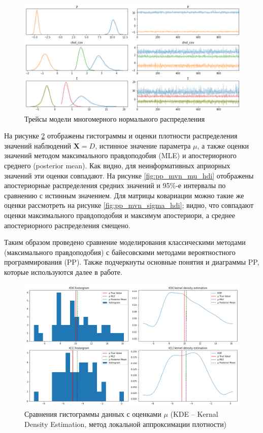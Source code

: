 \documentclass[a4paper,14pt]{extreport}
\begin{document}
\begin{figure}[H]
	\includegraphics[width=\linewidth]{img/gen/pp_mvn_trace.png}
	\caption{Трейсы модели многомерного нормального распределения}
	\label{fig:pp_mvn_trace}
\end{figure}

На рисунке \ref{fig:pp_mvn_mu_comparison} отображены гистограммы и оценки плотности распределения значений наблюдений $\mathbf{X} = D$, истинное значение параметра $\mu$, а также оценки значений методом максимального правдоподобия (MLE) и апостериорного среднего (posterior mean). Как видно, для неинформативных априорных значений эти оценки совпадают. На рисунке \ref{fig:pp_mvn_mu_hdi} отображены апостериорные распределения средних значений и 95\%-е интервалы по сравнению с истинным значением. Для матрицы ковариации можно такие же оценки рассмотреть на рисунке \ref{fig:pp_mvn_sigma_hdi}; видно, что совпадают оценки максимального правдоподобия и максимум апостериори, а среднее апостериорного распределения смещено.

Таким образом проведено сравнение моделирования классическими методами (максимального правдоподобия) с байесовскими методами вероятностного программирования (PP). Также подчеркнуты основные понятия и диаграммы PP, которые используются далее в работе.

\begin{figure}[H]
	\includegraphics[width=\linewidth]{img/gen/pp_mvn_mu_comparison.png}
	\caption{Сравнения гистограммы данных с оценками $\mu$ (KDE -- Kernal Density Estimation, метод локальной аппроксимации плотности)}
	\label{fig:pp_mvn_mu_comparison}
\end{figure}
\end{document}

